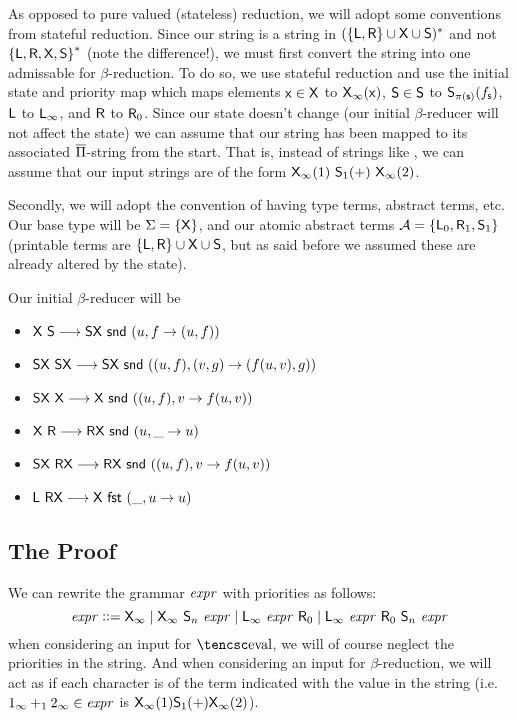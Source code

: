 \documentclass{llncs}
\begin{document}
As opposed to pure valued (stateless) reduction, we will adopt some conventions from stateful reduction.
Since our string is a string in $(\set{\s L,\s R}\cup\s X\cup\s S)^*$ and not $\set{\s L,\s R,\s X,\s S}^*$ (note the difference!), we must first convert the string into one admissable for
$\beta$-reduction.
To do so, we use stateful reduction and use the initial state and priority map which maps elements $\mathsf{x}\in\mathsf{X}$ to $\mathsf{X}_\infty(\mathsf{x})$, $\mathsf{S}\in\mathsf{S}$ to $\mathsf{S}_{\pi(\mathsf{s})}(f_{\mathsf{s}})$, $\mathsf{L}$ to
$\mathsf{L}_\infty$, and $\mathsf{R}$ to $\mathsf{R}_0$.
Since our state doesn't change (our initial $\beta$-reducer will not affect the state) we can assume that our string has been mapped to its associated $\overline{\Pi}$-string from the start.
That is, instead of strings like , we can assume that our input strings are of the form $\mathsf{X}_\infty(1)\ \mathsf{S}_1(+)\ \mathsf{X}_\infty(2)$.

Secondly, we will adopt the convention of having type terms, abstract terms, etc.
Our base type will be $\Sigma=\set{\s X}$, and our atomic abstract terms $\mathcal A=\set{\s L_0,\s R_1,\s S_1}$ (printable terms are $\set{\s L,\s R}\cup\s X\cup\s S$, but as said before we assumed these
are already altered by the state).

Our initial $\beta$-reducer will be
\begin{itemize}
    \item $\s X\ \s S\longto\s S\s X\ \snd\ (u,f\to(u,f))$
    \item $\s S\s X\ \s S\s X \longto\s S\s X\ \snd\ ((u,f),(v,g)\to(f(u,v),g))$
    \item $\s S\s X\ \s X\longto\s X\ \snd\ ((u,f),v\to f(u,v))$
    \item $\s X\ \s R \longto \s R\s X\ \snd\ (u,\_\to u)$
    \item $\s S\s X\ \s R\s X \longto\s R\s X\ \snd\ ((u,f),v\to f(u,v))$
    \item $\s L\ \s R\s X \longto\s X\ \fst\ (\_,u\to u)$
\end{itemize}

\subsection{The Proof}

We can rewrite the grammar ${\it expr}$ with priorities as follows:
\[ {\it expr} \mathrel{{\mathop:}{\mathop:}{=}} \mathsf{X}_\infty \mid \mathsf{X}_\infty\ \mathsf{S}_n\ {\it expr} \mid \mathsf{L}_\infty\ {\it expr}\ \mathsf{R}_0 \mid \mathsf{L}_\infty\ {\it expr}\ \mathsf{R}_0\ \mathsf{S}_n\ {\it expr} \]
when considering an input for $\eval$, we will of course neglect the priorities in the string.
And when considering an input for $\beta$-reduction, we will act as if each character is of the term indicated with the value in the string (i.e. $1_\infty+_12_\infty\in{\it expr}$ is
$\mathsf{X}_\infty(1)\mathsf{S}_1(+)\mathsf{X}_\infty(2)$).
\end{document}
